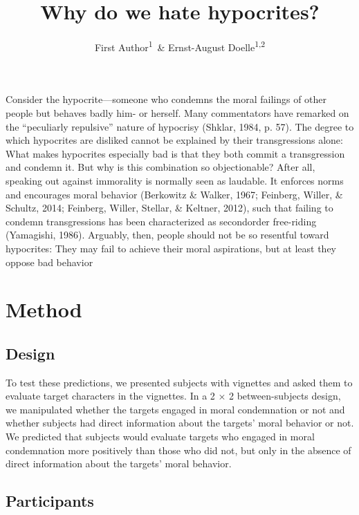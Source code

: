 \documentclass[english,man]{apa6}
\title{Why do we hate hypocrites?}
\author{First Author\textsuperscript{1}~\& Ernst-August Doelle\textsuperscript{1,2}}
\affiliation{
    \vspace{0.5cm}
          \textsuperscript{1} Wilhelm-Wundt-University\\
          \textsuperscript{2} Konstanz Business School  }
\theoremstyle{definition}
\theoremstyle{definition}
\theoremstyle{remark}
\begin{document}
\maketitle

\setcounter{secnumdepth}{0}



Consider the hypocrite---someone who condemns the moral failings of
other people but behaves badly him- or herself. Many commentators have
remarked on the \enquote{peculiarly repulsive} nature of hypocrisy
(Shklar, 1984, p. 57). The degree to which hypocrites are disliked
cannot be explained by their transgressions alone: What makes hypocrites
especially bad is that they both commit a transgression and condemn it.
But why is this combination so objectionable? After all, speaking out
against immorality is normally seen as laudable. It enforces norms and
encourages moral behavior (Berkowitz \& Walker, 1967; Feinberg, Willer,
\& Schultz, 2014; Feinberg, Willer, Stellar, \& Keltner, 2012), such
that failing to condemn transgressions has been characterized as
secondorder free-riding (Yamagishi, 1986). Arguably, then, people should
not be so resentful toward hypocrites: They may fail to achieve their
moral aspirations, but at least they oppose bad behavior

\section{Method}\label{method}

\subsection{Design}\label{design}

To test these predictions, we presented subjects with vignettes and
asked them to evaluate target characters in the vignettes. In a 2 × 2
between-subjects design, we manipulated whether the targets engaged in
moral condemnation or not and whether subjects had direct information
about the targets' moral behavior or not. We predicted that subjects
would evaluate targets who engaged in moral condemnation more positively
than those who did not, but only in the absence of direct information
about the targets' moral behavior.

\subsection{Participants}\label{participants}
\end{document}
